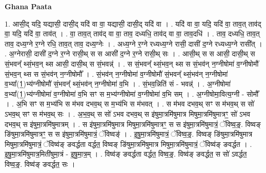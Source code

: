 \documentclass[17pt]{extarticle}
\begin{document}
\textbf{Ghana Paata } \newline

1. आसी॒द् यदि॒ यद्यासी॒ दासी॒द् यदि॑ वा वा॒ यद्यासी॒ दासी॒द् यदि॑ वा । . यदि॑ वा वा॒ यदि॒ यदि॑ वा॒ ताव॒त् ताव॑द् वा॒ यदि॒ यदि॑ वा॒ ताव॑त् । . वा॒ ताव॒त् ताव॑द् वा वा॒ ताव॒ दध्यधि॒ ताव॑द् वा वा॒ ताव॒दधि॑ । . ताव॒ दध्यधि॒ ताव॒त् ताव॒ दध्य॒ग्ने र॒ग्ने रधि॒ ताव॒त् ताव॒ दध्य॒ग्नेः । . अध्य॒ग्ने र॒ग्ने रध्यध्य॒ग्ने रासी॒ दासी॑ द॒ग्ने रध्यध्य॒ग्ने रासी᳚त् । . अ॒ग्नेरासी॒ दासी॑ द॒ग्ने र॒ग्ने रासी॒थ् स स आसी॑ द॒ग्ने र॒ग्ने रासी॒थ् सः । . आसी॒थ् स स आसी॒ दासी॒थ् स सं॒भवन्᳚ थ्सं॒भव॒न् थ्स आसी॒ दासी॒थ् स सं॒भवन्न्॑ । . स सं॒भवन्᳚ थ्सं॒भव॒न् थ्स स सं॒भव॑न् न॒ग्नीषोमा॑ व॒ग्नीषोमौ॑ सं॒भव॒न् थ्स स सं॒भव॑न् न॒ग्नीषोमौ᳚ । . सं॒भव॑न् न॒ग्नीषोमा॑ व॒ग्नीषोमौ॑ सं॒भवन्᳚ थ्सं॒भव॑न् न॒ग्नीषोमा॑ व॒भ्या᳚(1॒)भ्य॑ग्नीषोमौ॑ सं॒भवन्᳚ थ्सं॒भव॑न् न॒ग्नीषोमा॑ व॒भि । . सं॒भव॒न्निति॑ सं - भवन्न्॑ । . अ॒ग्नीषोमा॑ व॒भ्या᳚(1॒)भ्य॑ग्नीषोमा॑ व॒ग्नीषोमा॑ व॒भि सꣳ स म॒भ्य॑ग्नीषोमा॑ व॒ग्नीषोमा॑ व॒भि सम् । . अ॒ग्नीषोमा॒वित्य॒ग्नी - सोमौ᳚ । . अ॒भि सꣳ स म॒भ्य॑भि स म॑भव दभव॒थ् स म॒भ्य॑भि स म॑भवत् । . स म॑भव दभव॒थ् सꣳ स म॑भव॒थ् स सो॑ ऽभव॒थ् सꣳ स म॑भव॒थ् सः । . अ॒भ॒व॒थ् स सो॑ ऽभव दभव॒थ् स इ॑षुमा॒त्रमि॑षुमात्र मिषुमा॒त्रमि॑षुमात्रꣳ॒॒ सो॑ ऽभव दभव॒थ् स इ॑षुमा॒त्रमि॑षुमात्रम् । . स इ॑षुमा॒त्रमि॑षुमात्र मिषुमा॒त्रमि॑षुमात्रꣳ॒॒ स स इ॑षुमा॒त्रमि॑षुमात्रं॒ ॅविष्व॒ङ्॒. 
विष्वङ् ङि॑षुमा॒त्रमि॑षुमात्रꣳ॒॒ स स इ॑षुमा॒त्रमि॑षुमात्रं॒ ॅविष्वङ्॑ । . इ॒षु॒मा॒त्रमि॑षुमात्रं॒ ॅविष्व॒ङ्॒. विष्वङ् ङि॑षुमा॒त्रमि॑षुमात्र मिषुमा॒त्रमि॑षुमात्रं॒ ॅविष्व॑ङ् ङवर्द्धता वर्द्धत॒ विष्वङ् ङि॑षुमा॒त्रमि॑षुमात्र मिषुमा॒त्रमि॑षुमात्रं॒ ॅविष्व॑ङ् ङवर्द्धत । . इ॒षु॒मा॒त्रमि॑षुमात्र॒मिती॑षुमा॒त्रं - इ॒षु॒मा॒त्र॒म् । . विष्व॑ङ् ङवर्द्धता वर्द्धत॒ विष्व॒ङ्॒. विष्व॑ङ् ङवर्द्धत॒ स सो॑ ऽवर्द्धत॒ विष्व॒ङ्॒. विष्व॑ङ् ङवर्द्धत॒ सः । \newline
\end{document}
